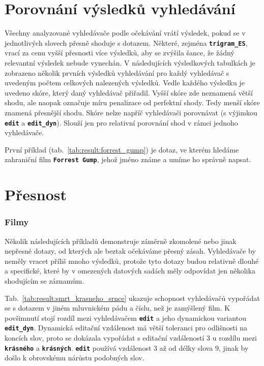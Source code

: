 \documentclass[11pt,letterpaper,oneside,openright]{book}
\newcommand{\bftt}[1]{\texttt{\textbf{#1}}}
\begin{document}
\section{Porovnání výsledků vyhledávání}
Všechny analyzované vyhledávače podle očekávání vrátí výsledek, pokud se v
jednotlivých slovech přesně shoduje s dotazem. Některé, zejména
\bftt{trigram\_ES}, vrací za cenu vyšší přesnosti více výsledků, aby se zvýšila
šance, že žádný relevantní výsledek nebude vynechán.  V následujících
výsledkových tabulkách je zobrazeno několik prvních výsledků vyhledávání pro
každý vyhledávač s uvedeným počtem celkových nalezených výsledků. Vedle každého
výsledku je uvedeno skóre, který daný vyhledávač přiřadil. Vyšší skóre zde
neznamená větší shodu, ale naopak označuje míru penalizace od perfektní shody.
Tedy menší skóre znamená přesnější shodu. Skóre nelze napříč vyhledávači
porovnávat (s výjimkou \bftt{edit} a \bftt{edit\_dyn}). Slouží jen pro
relativní porovnání shod v rámci jednoho vyhledávače.

\mbox{}\mbox{}

První příklad (tab.~\ref{tab:result:forrest_gump}) je dotaz, ve kterém hledáme
zahraniční film \bftt{Forrest Gump}, jehož jméno známe a umíme ho správně
napsat.

\section{Přesnost}
\subsubsection{Filmy}
Několik následujících příkladů demonstruje záměrně zkomolené nebo jinak
nepřesné dotazy, od kterých ale beztak očekáváme přesný zásah.
Vyhledávače by neměly vracet příliš mnoho výsledků, protože tyto dotazy
budou relativně dlouhé a specifické, které by v omezených datových
sadách měly odpovídat jen několika shodujícím se záznamům.

\mbox{}\mbox{}

Tab.~\ref{tab:result:smrt_krasneho_srnce} ukazuje schopnost vyhledávačů
vypořádat se s dotazem v jiném mluvnickém pádu a číslu, než je zamýšlený film.
K povšimnutí stojí rozdíl mezi vyhledávačem \bftt{edit} a jeho dynamickou
variantou \bftt{edit\_dyn}. Dynamická editační vzdálenost má větší toleranci
pro odlišnosti na koncích slov, proto se dokázala vypořádat s editační
vzdáleností $3$ u rozdílu mezi \bftt{krásného} a \bftt{krásných}.  \bftt{edit}
používá vzdálenost $3$ až od délky slova $9$, jinak by došlo k obrovskému
nárůstu podobných slov.
\end{document}

